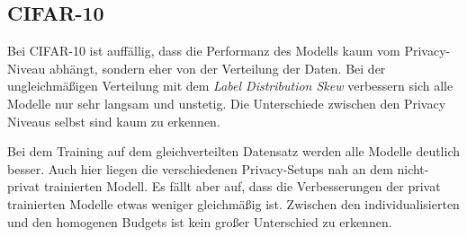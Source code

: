 \subsection{CIFAR-10}
Bei CIFAR-10 ist auffällig, dass die Performanz des Modells kaum vom Privacy-Niveau abhängt, sondern eher von der Verteilung der Daten. Bei der ungleichmäßigen Verteilung mit dem \textit{Label Distribution Skew} verbessern sich alle Modelle nur sehr langsam und unstetig. Die Unterschiede zwischen den Privacy Niveaus selbst sind kaum zu erkennen.

Bei dem Training auf dem gleichverteilten Datensatz werden alle Modelle deutlich besser. Auch hier liegen die verschiedenen Privacy-Setups nah an dem nicht-privat trainierten Modell. Es fällt aber auf, dass die Verbesserungen der privat trainierten Modelle etwas weniger gleichmäßig ist. Zwischen den individualisierten und den homogenen Budgets ist kein großer Unterschied zu erkennen.

